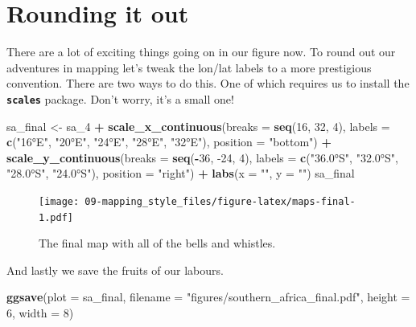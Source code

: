 \documentclass[
]{book}
\newenvironment{Shaded}{\begin{snugshade}}{\end{snugshade}}
\newcommand{\DataTypeTok}[1]{\textcolor[rgb]{0.13,0.29,0.53}{#1}}
\newcommand{\DecValTok}[1]{\textcolor[rgb]{0.00,0.00,0.81}{#1}}
\newcommand{\KeywordTok}[1]{\textcolor[rgb]{0.13,0.29,0.53}{\textbf{#1}}}
\newcommand{\NormalTok}[1]{#1}
\newcommand{\OperatorTok}[1]{\textcolor[rgb]{0.81,0.36,0.00}{\textbf{#1}}}
\newcommand{\StringTok}[1]{\textcolor[rgb]{0.31,0.60,0.02}{#1}}
\begin{document}
\hypertarget{rounding-it-out}{%
\section{Rounding it out}\label{rounding-it-out}}

There are a lot of exciting things going on in our figure now. To round out our adventures in mapping let's tweak the lon/lat labels to a more prestigious convention. There are two ways to do this. One of which requires us to install the \textbf{\texttt{scales}} package. Don't worry, it's a small one!

\begin{Shaded}
\begin{Highlighting}[]
\NormalTok{sa\_final <{-}}\StringTok{ }\NormalTok{sa\_}\DecValTok{4} \OperatorTok{+}
\StringTok{  }\KeywordTok{scale\_x\_continuous}\NormalTok{(}\DataTypeTok{breaks =} \KeywordTok{seq}\NormalTok{(}\DecValTok{16}\NormalTok{, }\DecValTok{32}\NormalTok{, }\DecValTok{4}\NormalTok{),}
                     \DataTypeTok{labels =} \KeywordTok{c}\NormalTok{(}\StringTok{"16°E"}\NormalTok{, }\StringTok{"20°E"}\NormalTok{, }\StringTok{"24°E"}\NormalTok{, }\StringTok{"28°E"}\NormalTok{, }\StringTok{"32°E"}\NormalTok{),}
                     \DataTypeTok{position =} \StringTok{"bottom"}\NormalTok{) }\OperatorTok{+}
\StringTok{  }\KeywordTok{scale\_y\_continuous}\NormalTok{(}\DataTypeTok{breaks =} \KeywordTok{seq}\NormalTok{(}\OperatorTok{{-}}\DecValTok{36}\NormalTok{, }\DecValTok{{-}24}\NormalTok{, }\DecValTok{4}\NormalTok{),}
                     \DataTypeTok{labels =} \KeywordTok{c}\NormalTok{(}\StringTok{"36.0°S"}\NormalTok{, }\StringTok{"32.0°S"}\NormalTok{, }\StringTok{"28.0°S"}\NormalTok{, }\StringTok{"24.0°S"}\NormalTok{),}
                     \DataTypeTok{position =} \StringTok{"right"}\NormalTok{) }\OperatorTok{+}
\StringTok{  }\KeywordTok{labs}\NormalTok{(}\DataTypeTok{x =} \StringTok{""}\NormalTok{, }\DataTypeTok{y =} \StringTok{""}\NormalTok{)}
\NormalTok{sa\_final}
\end{Highlighting}
\end{Shaded}

\begin{figure}
\centering
\texttt{[image: 09-mapping\_style\_files/figure-latex/maps-final-1.pdf]}
\caption{\label{fig:maps-final}The final map with all of the bells and whistles.}
\end{figure}

And lastly we save the fruits of our labours.

\begin{Shaded}
\begin{Highlighting}[]
\KeywordTok{ggsave}\NormalTok{(}\DataTypeTok{plot =}\NormalTok{ sa\_final, }\DataTypeTok{filename =} \StringTok{"figures/southern\_africa\_final.pdf"}\NormalTok{, }
       \DataTypeTok{height =} \DecValTok{6}\NormalTok{, }\DataTypeTok{width =} \DecValTok{8}\NormalTok{)}
\end{Highlighting}
\end{Shaded}
\end{document}
